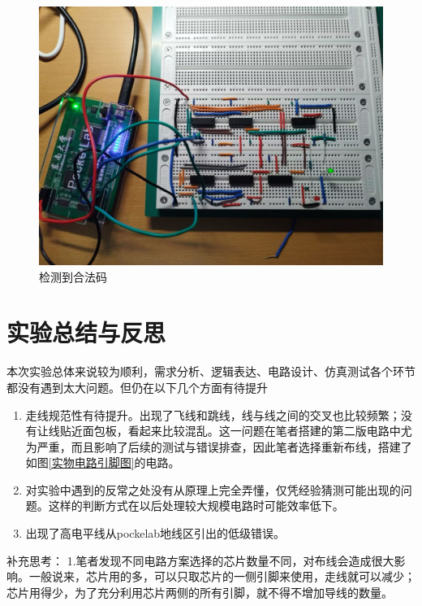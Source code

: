 \documentclass{ctexart}
\begin{document}
\begin{figure}[H]
    \centering
    \includegraphics[width=0.6\linewidth]{fig/实物电路图4.jpg}
    \caption{检测到合法码}
    \label{检测到合法码}
\end{figure}
\section{实验总结与反思}
本次实验总体来说较为顺利，需求分析、逻辑表达、电路设计、仿真测试各个环节都没有遇到太大问题。但仍在以下几个方面有待提升
\begin{enumerate}
    \item 走线规范性有待提升。出现了飞线和跳线，线与线之间的交叉也比较频繁；没有让线贴近面包板，看起来比较混乱。这一问题在笔者搭建的第二版电路中尤为严重，而且影响了后续的测试与错误排查，因此笔者选择重新布线，搭建了如图\ref{实物电路引脚图}的电路。
    \item 对实验中遇到的反常之处没有从原理上完全弄懂，仅凭经验猜测可能出现的问题。这样的判断方式在以后处理较大规模电路时可能效率低下。
    \item 出现了高电平线从pockelab地线区引出的低级错误。
\end{enumerate}
补充思考：
1.笔者发现不同电路方案选择的芯片数量不同，对布线会造成很大影响。一般说来，芯片用的多，可以只取芯片的一侧引脚来使用，走线就可以减少；芯片用得少，为了充分利用芯片两侧的所有引脚，就不得不增加导线的数量。
\end{document}
